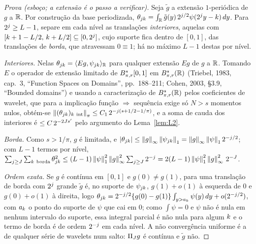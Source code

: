 \documentclass[11pt,a4paper]{article}
\begin{document}
\begin{proof}[Prova (esboço; a extensão é o passo a verificar)]
Seja $\tilde g$ a extensão $1$-periódica de $g$ a $\mathbb{R}$. Por construção da
base periodizada, $\theta_{jk} = \int_{\mathbb{R}}\tilde g(y)\,2^{j/2}
\psi(2^{j}y - k)\,dy$. Para $2^{j} \ge L-1$, separe em cada nível as
translações \emph{interiores}, aquelas com $[k + 1 - L/2,\, k + L/2] \subseteq
[0, 2^{j}]$, cujo suporte fica dentro de $[0,1]$, das translações de
\emph{borda}, que atravessam $0 \equiv 1$; há no máximo $L - 1$ destas por
nível.

\emph{Interiores.} Nelas $\theta_{jk} = \langle Eg, \psi_{jk} \rangle_{\mathbb{R}}$
para qualquer extensão $Eg$ de $g$ a $\mathbb{R}$. Tomando $E$ o operador de
extensão limitado de $B^{s}_{\pi,r}[0,1]$ em $B^{s}_{\pi,r}(\mathbb{R})$
(Triebel, 1983, cap.~3, ``Function Spaces on Domains'', pp.~188--211;
Cohen, 2003, \S 3.9, ``Bounded domains'') e usando a
caracterização de $B^{s}_{\pi,r}(\mathbb{R})$ pelos coeficientes de wavelet, que
para a implicação função $\Rightarrow$ sequência exige só $N > s$ momentos
nulos, obtém-se $\norm{(\theta_{\lev\tsl})_{\tsl\ \mathrm{int}}}_{\pi} \le
C_{1}\,2^{-\lev(s + 1/2 - 1/\pi)}$, e a soma de cauda dos interiores é
$\le C\,2^{-2Js'}$ pelo argumento do Lema~\ref{lem:L2}.

\emph{Borda.} Como $s > 1/\pi$, $g$ é limitada, e $|\theta_{jk}| \le
\left\lVert g \right\rVert_{\infty}\left\lVert \psi_{jk} \right\rVert_{1} = \left\lVert g \right\rVert_{\infty}\left\lVert \psi \right\rVert_{1}
2^{-j/2}$; com $L - 1$ termos por nível,
$\sum_{\lev\ge J}\sum_{\tsl\ \mathrm{borda}}\theta_{\lev\tsl}^{2} \le
(L-1)\norm{\psi}_{1}^{2}\norm{g}_{\infty}^{2}\sum_{\lev\ge J}2^{-\lev} =
2(L-1)\norm{\psi}_{1}^{2}\norm{g}_{\infty}^{2}\,2^{-J}$.

\emph{Ordem exata.} Se $g$ é contínua em $[0,1]$ e $g(0) \ne g(1)$, para
uma translação de borda com $2^{j}$ grande $\tilde g$ é, no suporte de
$\psi_{jk}$, $g(1) + o(1)$ à esquerda de $0$ e $g(0) + o(1)$ à direita,
logo $\theta_{jk} = 2^{-j/2}\{g(0) - g(1)\}\int_{y > a_{k}}\psi(y)\,dy
+ o(2^{-j/2})$, com $a_{k}$ o ponto do suporte de $\psi$ que cai em
$0$; como $\int\psi = 0$ e $\psi$ não é nula em nenhum intervalo do suporte,
essa integral parcial é não nula para algum $k$ e o termo de borda é de
ordem $2^{-j}$ em cada nível. A não convergência uniforme é a de qualquer
série de wavelets num salto: $\Pi_{J} g$ é contínua e $\tilde g$ não.
\end{proof}
\end{document}
